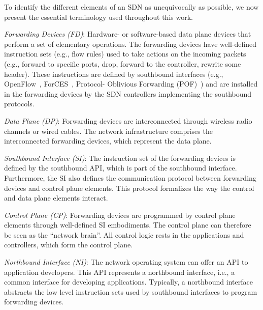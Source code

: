 To identify the different elements of an SDN as unequivocally as possible, we now present the 
essential terminology used throughout this work.

\noindent \textit{Forwarding Devices (FD)}: Hardware- or software-based data plane devices that perform 
a set of elementary operations. The forwarding devices have well-defined instruction sets (e.g., flow 
rules) used to take actions on the incoming packets (e.g., forward to specific ports, drop, forward to 
the controller, rewrite some header). These instructions are defined by southbound interfaces (e.g., 
OpenFlow~\cite{mckeown2008}, ForCES~\cite{doria2010}, Protocol- Oblivious Forwarding (POF)~\cite{song2013}) and are installed in the forwarding devices by the SDN controllers implementing the southbound protocols.

\noindent \textit{Data Plane (DP)}: Forwarding devices are interconnected through wireless radio channels 
or wired cables. The network infrastructure comprises the interconnected forwarding devices, which 
represent the data plane.

\noindent \textit{Southbound Interface (SI)}: The instruction set of the forwarding devices is defined 
by the southbound API, which is part of the southbound interface. Furthermore, the SI also defines the 
communication protocol between forwarding devices and control plane elements. This protocol formalizes 
the way the control and data plane elements interact.

\noindent \textit{Control Plane (CP)}: Forwarding devices are programmed by control plane elements 
through well-defined SI embodiments. The control plane can therefore be seen as the ``network brain''.
All control logic rests in the applications and controllers, which form the control plane.

\noindent \textit{Northbound Interface (NI)}: The network operating system can offer an API to application 
developers. This API represents a northbound interface, i.e., a common interface for developing applications.
Typically, a northbound interface abstracts the low level instruction sets used by southbound interfaces 
to program forwarding devices.

